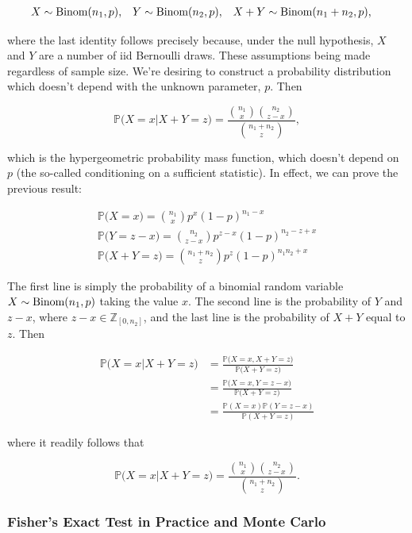 \documentclass{homework}
\begin{document}
\begin{align*}
    X &\sim \textnormal{Binom}(n_1, p), & Y &\sim \textnormal{Binom}(n_2, p), & X+Y &\sim \textnormal{Binom}(n_1+n_2, p),
\end{align*}

where the last identity follows precisely because, under the null hypothesis, $X$ and $Y$ are a number of iid Bernoulli draws. These assumptions being  made regardless of sample size. We're desiring to construct a probability distribution which doesn't depend with the unknown parameter, $p$. Then

$$
\mathds{P}\bigg(X = x \bigg| X+Y=z\bigg)= \frac{{{n_1}\choose{x}}{{n_2}\choose{z-x}}}{{{n_1+n_2}\choose{z}}},
$$

which is the hypergeometric probability mass function, which doesn't depend on $p$ (the so-called conditioning on a sufficient statistic). In effect, we can prove the previous result: 

\begin{align*}
    \mathds{P}\bigg(X=x\bigg) = {{n_1}\choose{x}} p^x (1-p)^{n_1-x} \\
    \mathds{P}\bigg(Y=z-x\bigg) =  {{n_2}\choose{z-x}} p^{z-x} (1-p)^{n_2-z+x} \\
    \mathds{P}\bigg(X+Y=z\bigg) =  {{n_1+n_2}\choose{z}} p^{z} (1-p)^{n_1n_2+x} 
\end{align*}

The first line is simply the probability of a binomial random variable $X \sim \textnormal{Binom}(n_1,p)$ taking the value $x$. The second line is the probability of $Y$ and $z-x$, where $z-x\in \mathds{Z}_{[0, n_2]}$, and the last line is the probability of $X+Y$ equal to $z$. Then

\begin{align*}
    \mathds{P}\bigg(X = x \bigg| X+Y=z\bigg) &= \frac{\mathds{P}\bigg(X = x, X+Y=z\bigg)}{\mathds{P}\bigg( X+Y=z\bigg)} \\
    &= \frac{\mathds{P}\bigg(X = x, Y=z-x\bigg)}{\mathds{P}\bigg( X+Y=z\bigg)} \\
    &= \frac{\mathds{P}(X=x)\mathds{P}(Y = z-x)}{\mathds{P}(X+Y=z)}
\end{align*}

where it readily follows that 

$$
\mathds{P}\bigg(X = x \bigg| X+Y=z\bigg)= \frac{{{n_1}\choose{x}}{{n_2}\choose{z-x}}}{{{n_1+n_2}\choose{z}}}.
$$

\subsubsection{Fisher's Exact Test in Practice and Monte Carlo}
\end{document}
